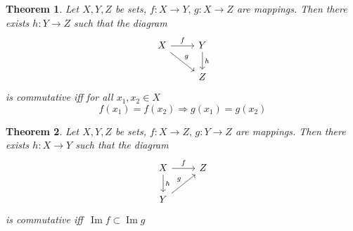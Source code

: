 \documentclass{article}
\newtheorem{thm}{Theorem}
\DeclareMathOperator{\Image}{Im}
\begin{document}
\begin{thm}
    Let $X, Y, Z$ be sets, $f:X\to Y,\,g:X\to Z$ are mappings. Then there exists $h: Y\to Z$ 
    such that the diagram
    \[
    \begin{tikzcd}
        X\arrow[rd, "g"] \arrow[r, "f"] & Y \arrow[d, "h"] \\
                                        & Z 
    \end{tikzcd}
    \]   
    is commutative iff for all $x_1, x_2\in X$
    \[
        f(x_1)=f(x_2) \Rightarrow g(x_1)=g(x_2) 
    \] 

\end{thm}

\begin{thm}
    Let $X, Y, Z$ be sets, $f:X\to Z,\,g:Y\to Z$ are mappings. 
    Then there exists $h: X\to Y$ such that the diagram
    \[
    \begin{tikzcd}
        X\arrow[d, "h"] \arrow[r, "f"] & Z \\
        Y\arrow[ru, "g"] & 
    \end{tikzcd}
    \]   
    is commutative iff\, $\Image f \subset  \Image g$
\end{thm}
\end{document}
